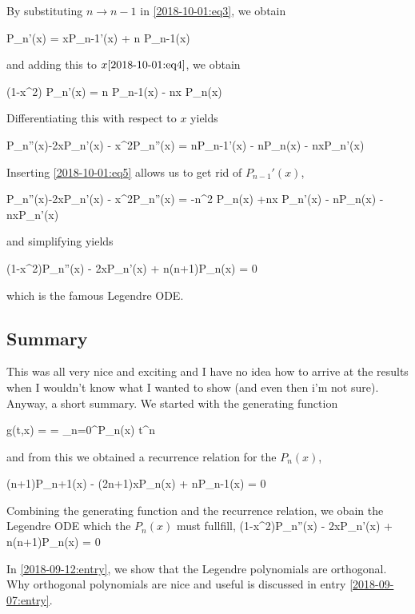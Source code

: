 By substituting $n \rightarrow n-1$ in \eqref{2018-10-01:eq3}, we obtain

\be\label{2018-10-01:eq5}
P_{n}'(x) = xP_{n-1}'(x) + n P_{n-1}(x)
\ee

and adding this to $x \eqref{2018-10-01:eq4}$, we obtain

\be
(1-x^2) P_n'(x) = n P_{n-1}(x) - nx P_n(x)
\ee

Differentiating this with respect to $x$ yields

\bee
P_n''(x)-2xP_n'(x) - x^2P_n''(x) = nP_{n-1}'(x) - nP_n(x) - nxP_n'(x)
\eee

Inserting \eqref{2018-10-01:eq5} allows us to get rid of $P_{n-1}'(x)$,

\bee
P_n''(x)-2xP_n'(x) - x^2P_n''(x) = -n^2 P_{n}(x) +nx P_n'(x) - nP_n(x) - nxP_n'(x)
\eee

and simplifying yields

\bee
(1-x^2)P_n''(x) - 2xP_n'(x) + n(n+1)P_n(x) = 0
\eee

which is the famous Legendre ODE.

\subsection{Summary}

This was all very nice and exciting and I have no idea how to arrive at the results when I wouldn't know what I wanted to show (and even then i'm not sure). Anyway, a short summary. We started with the generating function

\bee
g(t,x) =  = \sum_{n=0}^\infty P_n(x) t^n
\eee

and from this we obtained a recurrence relation for the $P_n(x)$,

\bee
(n+1)P_{n+1}(x) - (2n+1)xP_n(x) + nP_{n-1}(x) = 0
\eee

Combining the generating function and the recurrence relation, we obain the Legendre ODE which the $P_n(x)$ must fullfill,
\bee
(1-x^2)P_n''(x) - 2xP_n'(x) + n(n+1)P_n(x) = 0
\eee

In \ref{2018-09-12:entry}, we show that the Legendre polynomials are orthogonal. Why orthogonal polynomials are nice and useful is discussed in entry \ref{2018-09-07:entry}.


